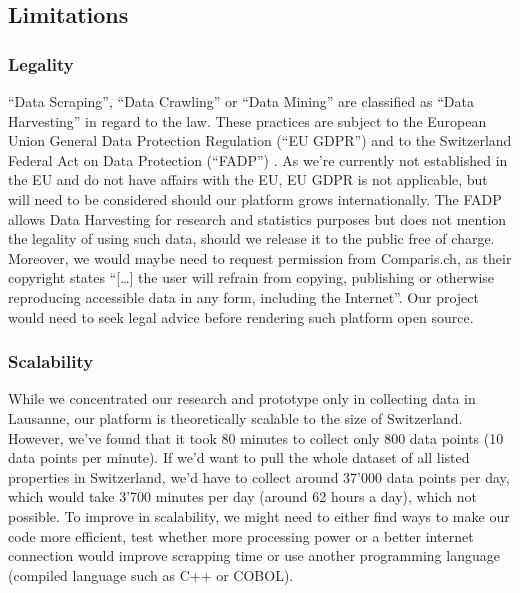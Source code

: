 \documentclass[main]{subfiles}
\begin{document}
\subsection{Limitations}

\subsubsection{Legality}
“Data Scraping”, “Data Crawling” or “Data Mining” are classified as “Data Harvesting” in regard to the law. 
These practices are subject to the European Union General Data Protection Regulation (“EU GDPR”) 
and to the Switzerland Federal Act on Data Protection (“FADP”) \cite{conradWebDataCollection2019}.
As we're currently not established in the EU and do not have affairs with the EU, EU GDPR is not applicable, 
but will need to be considered should our platform grows internationally.
The FADP allows Data Harvesting for research and statistics purposes but does not mention the legality of using such data, 
should we release it to the public free of charge. Moreover, we would maybe need to request permission from Comparis.ch,
 as their copyright states “[…] the user will refrain from copying, publishing or otherwise reproducing accessible data in any form, 
 including the Internet”. Our project would need to seek legal advice before rendering such platform open source.

\subsubsection{Scalability}
While we concentrated our research and prototype only in collecting data in Lausanne, our platform is theoretically scalable to the size of Switzerland. 
However, we've found that it took 80 minutes to collect only 800 data points (10 data points per minute). 
If we'd want to pull the whole dataset of all listed properties in Switzerland, we'd have to collect around 37'000 data points per day,
which would take 3'700 minutes per day (around 62 hours a day), which not possible. 
To improve in scalability, we might need to either find ways to make our code more efficient, 
test whether more processing power or a better internet connection would improve scrapping 
time or use another programming language (compiled language such as C++ or COBOL).
\end{document}
